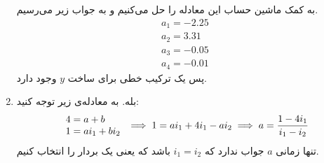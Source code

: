 \begin{enumerate}[wide, labelwidth=!, labelindent=0pt]
به کمک ماشین حساب این معادله را حل می‌کنیم و به جواب زیر می‌رسیم.
\begin{gather*}
    a_1 = -2.25\\
    a_2 = 3.31\\
    a_3 = -0.05\\
    a_4 = -0.01
\end{gather*}
پس یک ترکیب خطی
برای ساخت
$y$
وجود دارد.
    \item بله. به معادله‌ی زیر توجه کنید:
    \begin{align*}
        \begin{array}{r@{\mskip\thickmuskip}l}
            4 &= a + b\\
            1 &= ai_1 + bi_2
        \end{array}
        \implies
        1 = ai_1 + 4i_1 - ai_2
        \implies
        a = \frac{1 - 4i_1}{i_1 - i_2}
    \end{align*}
    تنها زمانی
    $a$
    جواب ندارد که
    $i_1 = i_2$
    باشد که یعنی یک بردار را انتخاب کنیم.
\end{enumerate}